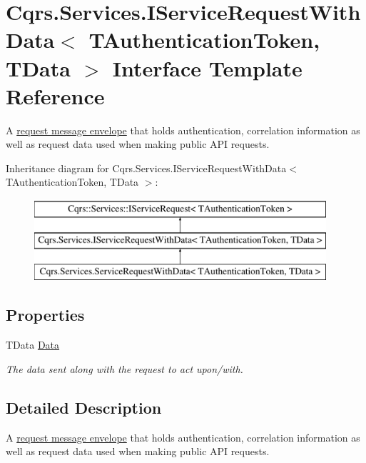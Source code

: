 \hypertarget{interfaceCqrs_1_1Services_1_1IServiceRequestWithData}{}\section{Cqrs.\+Services.\+I\+Service\+Request\+With\+Data$<$ T\+Authentication\+Token, T\+Data $>$ Interface Template Reference}
\label{interfaceCqrs_1_1Services_1_1IServiceRequestWithData}


A \hyperlink{}{request message envelope} that holds authentication, correlation information as well as request data used when making public A\+PI requests.  


Inheritance diagram for Cqrs.\+Services.\+I\+Service\+Request\+With\+Data$<$ T\+Authentication\+Token, T\+Data $>$\+:\begin{figure}[H]
\begin{center}
\leavevmode
\includegraphics[height=3.000000cm]{interfaceCqrs_1_1Services_1_1IServiceRequestWithData}
\end{center}
\end{figure}
\subsection*{Properties}
\begin{DoxyCompactItemize}
\item 
T\+Data \hyperlink{interfaceCqrs_1_1Services_1_1IServiceRequestWithData_a6d2d68c5e99b9be14d2a0ee800eb87f3}{Data}
\begin{DoxyCompactList}\small\item\em The data sent along with the request to act upon/with. \end{DoxyCompactList}\end{DoxyCompactItemize}


\subsection{Detailed Description}
A \hyperlink{}{request message envelope} that holds authentication, correlation information as well as request data used when making public A\+PI requests. 


